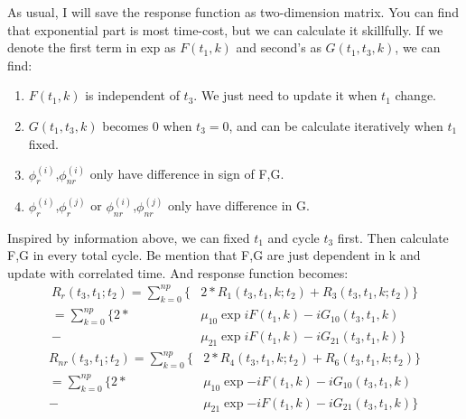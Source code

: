 \documentclass[12pt,a4paper,scale=1.0]{article}
\begin{document}
	As usual, I will save the response function as two-dimension matrix. You can find that exponential part is most time-cost, but we can calculate it skillfully. If we denote the first term in exp as $F(t_1,k)$ and second's as $G(t_1,t_3,k)$, we can find:
	\begin{enumerate}
		\item $F(t_1,k)$ is independent of $t_3$. We just need to update it when $t_1$ change.
		\item $G(t_1,t_3,k)$ becomes 0 when $t_3=0$, and can be calculate iteratively when $t_1$ fixed.
		\item $\phi^{(i)}_{r}$,$\phi^{(i)}_{nr}$ only have difference in sign of F,G.
		\item $\phi^{(i)}_{r}$,$\phi^{(j)}_{r}$ or $\phi^{(i)}_{nr}$,$\phi^{(j)}_{nr}$  only have difference in G.
	\end{enumerate}

	Inspired by information above, we can fixed $t_1$ and cycle $t_3$ first. Then calculate F,G in every total cycle. Be mention that F,G are just dependent in k and update with correlated time. And response function becomes:
	\begin{equation}  
	\begin{aligned}
	R_{r} (t_3,t_1;t_2)  = \sum_{k=0}^{np} \{ &  2*R_1(t_3,t_1,k;t_2) + R_3(t_3,t_1,k;t_2) \} \\
	 = \sum_{k=0}^{np} \{ 2* & \mu_{10} \exp{i F(t_1,k) - i G_{10}(t_3,t_1,k) }  \\
	 -  & \mu_{21} \exp{i F(t_1,k) - i G_{21}(t_3,t_1,k) }   \}
		\end{aligned}
	\end{equation}
	\begin{equation}  
	\begin{aligned}
	R_{nr} (t_3,t_1;t_2)  = \sum_{k=0}^{np} \{ & 2*R_4(t_3,t_1,k;t_2) + R_6(t_3,t_1,k;t_2) \} \\
	 = \sum_{k=0}^{np} \{ 2*& \mu_{10} \exp{-i F(t_1,k) - i G_{10}(t_3,t_1,k) }  \\
	 - & \mu_{21}  \exp{-i F(t_1,k) - i G_{21}(t_3,t_1,k) }   \}
	\end{aligned}
	\end{equation}
		 
	

 	
\end{document}
